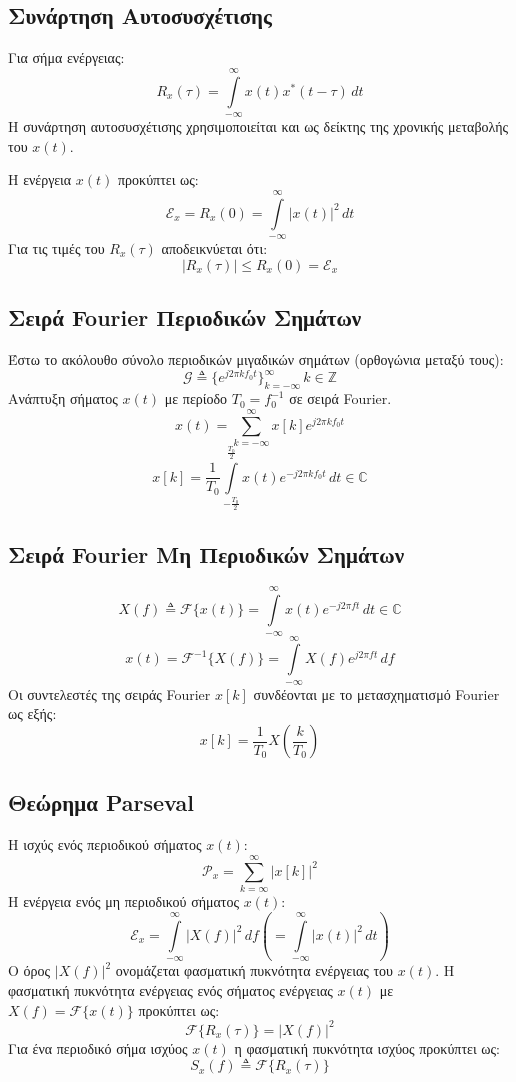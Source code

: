 \documentclass[a4paper,12pt]{article}
\begin{document}
\subsection*{Συνάρτηση Αυτοσυσχέτισης}
Για σήμα ενέργειας:
\[
R_{x}(\tau)=\int\limits^{\infty}_{-\infty}x(t)x^\ast(t-\tau) \, dt
\]
Η συνάρτηση αυτοσυσχέτισης χρησιμοποιείται και ως δείκτης της χρονικής μεταβολής του \(x(t)\).

Η ενέργεια \(x(t)\) προκύπτει ως:
\[
\mathcal{E}_x=R_x(0)=\int\limits^\infty_{-\infty} |x(t)|^2 \, dt
\]
Για τις τιμές του \(R_x(\tau)\) αποδεικνύεται ότι:
\[
|R_x(\tau)| \leq R_x(0)=\mathcal{E}_x
\]

\subsection*{Σειρά Fourier Περιοδικών Σημάτων}
Έστω το ακόλουθο σύνολο περιοδικών μιγαδικών σημάτων (ορθογώνια μεταξύ τους):
\[
\mathcal{G}\triangleq \{e^{j2\pi k f_0 t}\}^\infty_{k=-\infty} \, k\in \mathbb{Z}
\]
Ανάπτυξη σήματος \(x(t)\) με περίοδο \(T_0 = f_0^{-1}\) σε σειρά Fourier.
\[
x(t)=\sum_{k=-\infty}^\infty x[k]e^{j2\pi k f_0 t}
\]
\[
x[k]=\frac{1}{T_0} \int\limits^{\frac{T_0}{2}}_{-\frac{T_0}{2}} x(t)e^{-j2\pi k f_0 t} \, dt \in \mathbb{C}
\]

\subsection*{Σειρά Fourier Μη Περιοδικών Σημάτων}
\[
X(f)\triangleq \mathcal{F}\{x(t)\}=\int\limits_{-\infty}^{\infty} x(t) e^{-j2\pi ft} \, dt \in \mathbb{C}
\]
\[
x(t)=\mathcal{F}^{-1}\{X(f)\} = \int\limits_{-\infty}^\infty X(f)e^{j2 \pi ft} \, df
\]
Οι συντελεστές της σειράς Fourier \(x[k]\) συνδέονται με το μετασχηματισμό Fourier ως εξής:
\[
x[k]=\frac{1}{T_0} X \left (\frac{k}{T_0} \right)
\]

\subsection*{Θεώρημα Parseval}
Η ισχύς ενός περιοδικού σήματος \(x(t)\):
\[
\mathcal{P}_x = \sum_{k=\infty}^\infty |x[k]|^2
\]
Η ενέργεια ενός μη περιοδικού σήματος \(x(t)\):
\[
\mathcal{E}_x=\int\limits^\infty_{-\infty} |X(f)|^2 \, df \left ( = \int\limits_{-\infty}^{\infty} |x(t)|^2 \, dt\right)
\]
Ο όρος \(|X(f)|^2\) ονομάζεται φασματική πυκνότητα ενέργειας του \(x(t)\). Η φασματική πυκνότητα ενέργειας ενός σήματος ενέργειας \(x(t)\) με \(X(f)=\mathcal{F}\{x(t)\}\) προκύπτει ως:
\[
\mathcal{F}\{R_x(\tau)\}=|X(f)|^2
\]
Για ένα περιοδικό σήμα ισχύος \(x(t)\) η φασματική πυκνότητα ισχύος προκύπτει ως:
\[
S_x(f) \triangleq \mathcal{F}\{R_x(\tau)\}
\]
\end{document}

